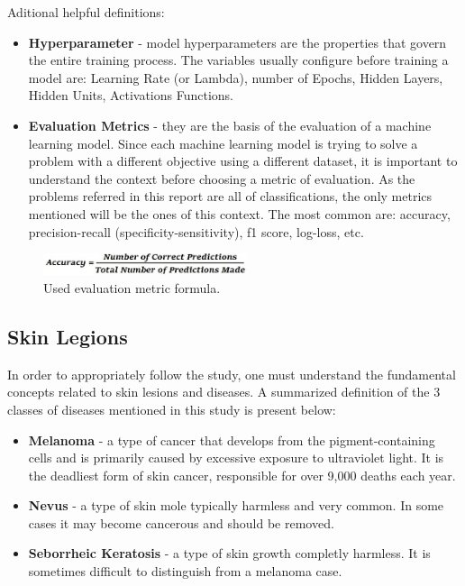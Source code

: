 \documentclass[10pt]{IEEEtran}
\begin{document}
Aditional helpful definitions:

\begin{itemize}
\item \textbf{Hyperparameter} - model hyperparameters are the properties that govern the entire training process. The variables usually configure before training a model are: Learning Rate (or Lambda), number of Epochs, Hidden Layers, Hidden Units, Activations Functions. 
\item \textbf{Evaluation Metrics} - they are the basis of the evaluation of a machine learning model. Since each machine learning model is trying to solve a problem with a different objective using a different dataset, it is important to understand the context before choosing a metric of evaluation. As the problems referred in this report are all of classifications, the only metrics mentioned will be the ones of this context. The most common are: accuracy, precision-recall (specificity-sensitivity), f1 score, log-loss, etc.
\end{itemize}

\begin{figure}[H]
\centering
\includegraphics[width=6cm]{AccuracyMetric.jpg}
\caption{Used evaluation metric formula.}
\end{figure}
\newpage{}

\subsection{Skin Legions}

In order to appropriately follow the study, one must understand the fundamental concepts related to skin lesions and diseases.
A summarized definition of the 3 classes of diseases mentioned in this study is present below:

\begin{itemize}
\item \textbf{Melanoma} - a type of cancer that develops from the pigment-containing cells and is primarily caused by excessive exposure to ultraviolet light. It is the deadliest form of skin cancer, responsible for over 9,000 deaths each year. 
\item \textbf{Nevus} - a type of skin mole typically harmless and very common. In some cases it may become cancerous and should be removed.
\item \textbf{Seborrheic Keratosis} - a type of skin growth completly harmless. It is sometimes difficult to distinguish from a melanoma case.
\end{itemize}
\end{document}
